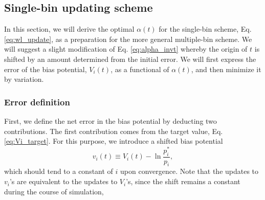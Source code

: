 \documentclass[reprint, superscriptaddress, floatfix]{revtex4-1}
\begin{document}
\subsection{\label{sec:single-bin}
Single-bin updating scheme}



In this section,
we will derive the optimal $\alpha(t)$
for the single-bin scheme,
Eq. \eqref{eq:wl_update},
as a preparation
for the more general multiple-bin scheme.
%
We will suggest a slight modification of Eq. \eqref{eq:alpha_invt}
whereby the origin of $t$ is shifted by an amount
determined from the initial error.
%
We will first express the error of
the bias potential, $V_i(t)$,
as a functional of $\alpha(t)$,
and then minimize it by variation.
%



\subsubsection{Error definition}



First, we define the net error in the bias potential
by deducting two contributions.
%
The first contribution comes from the target value,
Eq. \eqref{eq:Vi_target}.
%
For this purpose,
we introduce a shifted bias potential
%
\begin{equation}
  v_i(t)
  \equiv
  V_i(t)
  -
  \ln \frac { p^*_i }
            { p_i }
  ,
  \label{eq:v_def}
\end{equation}
%
which should tend to a constant of $i$
upon convergence.
Note that the updates to $v_i$'s are
equivalent to the updates to $V_i$'s,
since the shift
remains a constant during the course of simulation,
\end{document}
